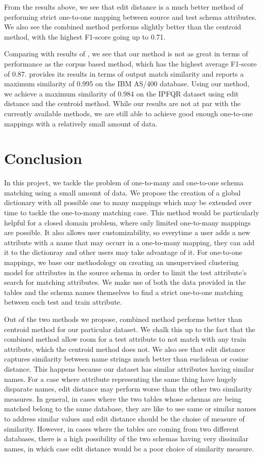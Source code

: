 \documentclass[conference]{IEEEtran}
\begin{document}
From the results above, we see that edit distance is a much better method of performing strict one-to-one mapping between source and test schema attributes. We also see the combined method performs slightly better than the centroid method, with the highest F1-score going up to 0.71. 

Comparing with results of \cite{ref4}, we see that our method is not as great in terms of performance as the corpus based method, which has the highest average F1-score of 0.87. \cite{ref1} provides its results in terms of output match similarity and reports a maximum similarity of 0.995 on the IBM AS/400 database. Using our method, we achieve a maximum similarity of 0.984 on the IPFQR dataset using edit distance and the centroid method. While our results are not at par with the currently available methods, we are still able to achieve good enough one-to-one mappings with a relatively small amount of data.


\section{Conclusion}
In this project, we tackle the problem of one-to-many and one-to-one schema matching using a small amount of data. We propose the creation of a global dictionary with all possible one to many mappings which may be extended over time to tackle the one-to-many matching case. This method would be particularly helpful for a closed domain problem, where only limited one-to-many mappings are possible. It also allows user customizability, so everytime a user adds a new attribute with a name that may occurr in a one-to-many mapping, they can add it to the dictionray and other users may take advantage of it. For one-to-one mappings, we base our methodology on creating an unsupervised clustering model for attributes in the source schema in order to limit the test attribute's search for matching attributes. We make use of both the data provided in the tables and the schema names themselves to find a strict one-to-one matching between each test and train attribute. 

Out of the two methods we propose, combined method performs better than centroid method for our particular dataset. We chalk this up to the fact that the combined method allow room for a test attribute to not match with any train attribute, which the centroid method does not. We also see that edit distance captures similarity between name strings much better than euclidean or cosine distance. This happens because our dataset has similar attributes having similar names. For a case where attribute representing the same thing have hugely disparate names, edit distance may perform worse than the other two similarity measures. In general, in cases where the two tables whose schemas are being matched belong to the same database, they are like to use same or similar names to address similar values and edit distance should be the choise of measure of similarity. However, in cases where the tables are coming from two different databases, there is a high possibility of the two schemas having very dissimilar names, in which case edit distance would be a poor choice of similarity measure. 
\end{document}
